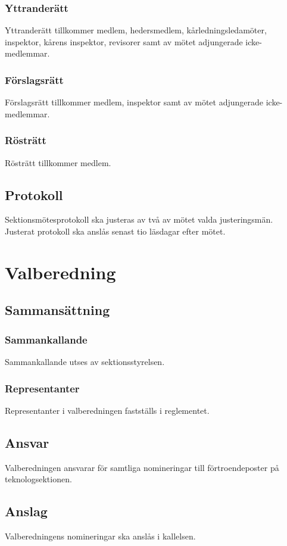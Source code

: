 \documentclass[a4paper]{dtek}
\begin{document}
\subsubsection{Yttranderätt}
Yttranderätt tillkommer medlem, hedersmedlem, kårledningsledamöter, inspektor, kårens inspektor, revisorer samt av mötet adjungerade icke-medlemmar.
\subsubsection{Förslagsrätt}
Förslagsrätt tillkommer medlem, inspektor samt av mötet adjungerade icke-medlemmar.
\subsubsection{Rösträtt}
Rösträtt tillkommer medlem.
\subsection{Protokoll}
Sektionsmötesprotokoll ska justeras av två av mötet valda justeringsmän. Justerat protokoll ska anslås senast tio läsdagar efter mötet.
\newpage

\section{Valberedning}
\label{sec:valberedning}
\subsection{Sammansättning}
\subsubsection{Sammankallande}
Sammankallande utses av sektionsstyrelsen.
\subsubsection{Representanter}
Representanter i valberedningen fastställs i reglementet.
\subsection{Ansvar}
Valberedningen ansvarar för samtliga nomineringar till förtroendeposter på teknologsektionen.
\subsection{Anslag}
Valberedningens nomineringar ska anslås i kallelsen.
\end{document}
